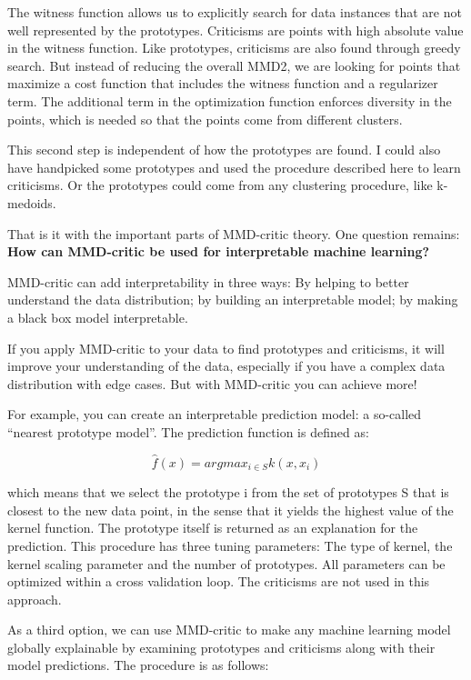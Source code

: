 \documentclass[
  11pt,
]{scrbook}
\begin{document}
The witness function allows us to explicitly search for data instances that are not well represented by the prototypes.
Criticisms are points with high absolute value in the witness function.
Like prototypes, criticisms are also found through greedy search.
But instead of reducing the overall MMD2, we are looking for points that maximize a cost function that includes the witness function and a regularizer term.
The additional term in the optimization function enforces diversity in the points, which is needed so that the points come from different clusters.

This second step is independent of how the prototypes are found.
I could also have handpicked some prototypes and used the procedure described here to learn criticisms.
Or the prototypes could come from any clustering procedure, like k-medoids.

That is it with the important parts of MMD-critic theory.
One question remains:
\textbf{How can MMD-critic be used for interpretable machine learning?}

MMD-critic can add interpretability in three ways:
By helping to better understand the data distribution;
by building an interpretable model;
by making a black box model interpretable.

If you apply MMD-critic to your data to find prototypes and criticisms, it will improve your understanding of the data, especially if you have a complex data distribution with edge cases.
But with MMD-critic you can achieve more!

For example, you can create an interpretable prediction model: a so-called ``nearest prototype model''.
The prediction function is defined as:

\[\hat{f}(x)=argmax_{i\in{}S}k(x,x_i)\]

which means that we select the prototype i from the set of prototypes S that is closest to the new data point, in the sense that it yields the highest value of the kernel function.
The prototype itself is returned as an explanation for the prediction.
This procedure has three tuning parameters:
The type of kernel, the kernel scaling parameter and the number of prototypes.
All parameters can be optimized within a cross validation loop.
The criticisms are not used in this approach.

As a third option, we can use MMD-critic to make any machine learning model globally explainable by examining prototypes and criticisms along with their model predictions.
The procedure is as follows:
\end{document}
